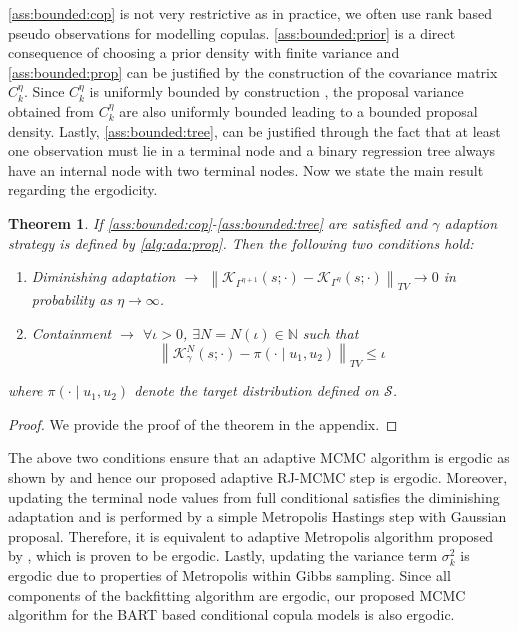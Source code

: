\documentclass[
12pt]{article}
\newtheorem{theorem}{Theorem}[section]
\begin{document}
	\cref{ass:bounded:cop} is not very restrictive as in practice, we often use rank based pseudo observations for modelling copulas. \cref{ass:bounded:prior} is a direct consequence of choosing a prior density with finite variance and \cref{ass:bounded:prop} can be justified by the construction of the covariance matrix $C^{\eta}_k$. Since $C^{\eta}_k$ is uniformly bounded by construction \citep{haario_AMH}, the proposal variance obtained from $C^{\eta}_k$ are also uniformly bounded leading to a bounded proposal density. Lastly, \cref{ass:bounded:tree}, can be justified through the fact that at least one observation must lie in a terminal node and a binary regression tree always have an internal node with two terminal nodes. Now we state the main result regarding the ergodicity.
	
	\begin{theorem}
		If \cref{ass:bounded:cop}-\cref{ass:bounded:tree} are satisfied and $\gamma$ adaption strategy is defined by \cref{alg:ada:prop}. Then the following two conditions hold:
		\begin{enumerate}
			\item Diminishing adaptation $\rightarrow$ $\left\|\mathcal{K}_{\Gamma^{\eta+1}}(s;\cdot)-\mathcal{K}_{\Gamma^{\eta}}(s;\cdot)\right\|_{TV}\to 0$ in probability as $\eta\to \infty$.
			\item Containment $\rightarrow$ $\forall\iota>0$, $\exists N = N(\iota)\in \mathbb{N}$ such that 
			\begin{equation*}
				\left\|\mathcal{K}^N_{\gamma}(s;\cdot) - \pi(\cdot\mid u_1,u_2)\right\|_{TV} \le \iota
			\end{equation*}
		\end{enumerate}
		where $\pi(\cdot\mid u_1, u_2)$ denote the target distribution defined on $\mathcal{S}$.
	\end{theorem}
	
	\begin{proof}
		We provide the proof of the theorem in the appendix.
	\end{proof}
	
	The above two conditions ensure that an adaptive MCMC algorithm is ergodic as shown by \citet{roberts-rosenthal-ada_MCMC2007} and hence our proposed adaptive RJ-MCMC step is ergodic. Moreover, updating the terminal node values from full conditional satisfies the diminishing adaptation and is performed by a simple Metropolis Hastings step with Gaussian proposal. Therefore, it is equivalent to adaptive Metropolis algorithm proposed by \citet{haario_AMH}, which is proven to be ergodic. Lastly, updating the variance term $\sigma^2_k$ is ergodic due to properties of Metropolis within Gibbs sampling. Since all components of the backfitting algorithm are ergodic, our proposed MCMC algorithm for the BART based conditional copula models is also ergodic.
	
\end{document}
